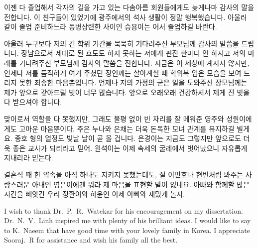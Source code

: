 이젠 다 졸업해서 각자의 길을 가고 있는 다솜아름 회원들에게도 늦게나마 감사의 말을 전합니다. 이 친구들이 있었기에 광주에서의 석사 생활이 정말 행복했습니다. 아울러 같이 졸업 준비하느라 동병상련한 사이인 승용이는 어서 졸업하길 바란다.

아울러 누구보다 저의 긴 학위 기간을 묵묵히 기다려주신 부모님께 감사의 말씀을 드립니다. 장남으로서 제대로 된 효도도 하지 못하는 저에게 핀잔 한마디 안 하시고 저의 미래를 기다려주신 부모님께 감사의 말씀을 전합니다. 지금은 이 세상에 계시지 않지만, 언제나 저를 듬직하게 여겨 주셨던 장인께는 살아계실 때 학위복 입은 모습을 보여 드리지 못한 죄송한 마음뿐입니다. 언제나 저의 가정의 굳은 일을 도와주신 장모님께는 제가 앞으로 갚아드릴 빚이 너무 많습니다. 앞으로 오래오래 건강하셔서 제게 진 빚을 다 받으셔야 합니다.

맞이로서 역할을 다 못했지만, 그래도 불평 없이 빈 자리를 잘 메워준 영주와 성원이에게도 고마운 마음뿐이다. 주은 누나와 은채는 더욱 돈독한 모녀 관계를 유지하길 빌게요. 종호 형의 열정도 빛날 날이 곧 올 겁니다. 은경이는 지금도 그렇지만 앞으로도 더욱 좋은 교사가 되리라고 믿어. 원석이는 이제 속세의 굴레에서 벗어났으니 자유롭게 지내리라 믿는다.

결혼식 때 한 약속을 아직 하나도 지키지 못했는데도, 절 이민호나 현빈처럼 봐주는 사랑스러운 아내인 영은이에겐 뭐라 제 마음을 표현할 말이 없네요. 아빠와 함께할 많은 시간을 빼앗긴 우리 정환이와 하윤인 이제 아빠와 재밌게 놀자.

I wish to thank Dr.~P.~R.~Watekar for his encouragement on my dissertation. Dr.~N.~V.~Linh inspired me with plenty of his brilliant ideas. I would like to say to K.~Naeem that have good time with your lovely family in Korea. I appreciate Sooraj.~R for assistance and wish his family all the best.
